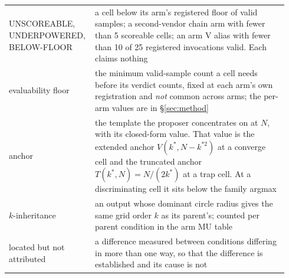 \begin{footnotesize}
\begin{longtable}{@{}p{0.26\linewidth}p{0.68\linewidth}@{}}
UNSCOREABLE, UNDERPOWERED, BELOW-FLOOR & a cell below its arm's registered floor of valid samples; a second-vendor chain arm with fewer than 5 scoreable cells; an arm V alias with fewer than 10 of 25 registered invocations valid. Each claims nothing \\
evaluability floor & the minimum valid-sample count a cell needs before its verdict counts, fixed at each arm's own registration and \emph{not} common across arms; the per-arm values are in \S\ref{sec:method} \\
anchor & the template the proposer concentrates on at $N$, with its closed-form value. That value is the extended anchor $V(k^*, N - k^{*2})$ at a converge cell and the truncated anchor $T(k^*, N) = N/(2k^*)$ at a trap cell. At a discriminating cell it sits below the family argmax \\
$k$-inheritance & an output whose dominant circle radius gives the same grid order $k$ as its parent's; counted per parent condition in the arm MU table \\
located but not attributed & a difference measured between conditions differing in more than one way, so that the difference is established and its cause is not \\
\bottomrule
\end{longtable}
\end{footnotesize}
